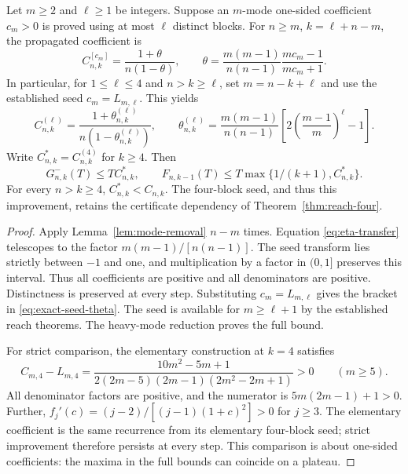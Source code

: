 \begin{theorem}
\label{thm:seeded}
Let $m\ge2$ and $\ell\ge1$ be integers. Suppose an $m$-mode one-sided coefficient $c_m>0$ is proved using at most
$\ell$ distinct blocks. For $n\ge m$, $k=\ell+n-m$, the propagated
coefficient is
\begin{equation}\label{eq:general-seed}
 C^{[c_m]}_{n,k}=\frac{1+\theta}{n(1-\theta)},\qquad
 \theta=\frac{m(m-1)}{n(n-1)}\frac{mc_m-1}{mc_m+1}.
\end{equation}
In particular, for $1\le\ell\le4$ and $n>k\ge\ell$, set $m=n-k+\ell$
and use the established seed $c_m=L_{m,\ell}$. This yields
\begin{equation}\label{eq:exact-seed-theta}
 C^{(\ell)}_{n,k}=\frac{1+\theta^{(\ell)}_{n,k}}
                         {n(1-\theta^{(\ell)}_{n,k})},\qquad
 \theta^{(\ell)}_{n,k}=\frac{m(m-1)}{n(n-1)}
             \left[2\left(\frac{m-1}{m}\right)^\ell-1\right].
\end{equation}
Write $C^*_{n,k}=C^{(4)}_{n,k}$ for $k\ge4$. Then
\begin{equation}\label{eq:seeded-full}
 G^-_{n,k}(T)\le TC^*_{n,k},\qquad
 F_{n,k-1}(T)\le T\max\{1/(k+1),C^*_{n,k}\}.
\end{equation}
For every $n>k\ge4$, $C^*_{n,k}<C_{n,k}$. The four-block seed, and thus
this improvement, retains the certificate dependency of
Theorem~\ref{thm:reach-four}.
\end{theorem}
\begin{proof}
Apply Lemma~\ref{lem:mode-removal} $n-m$ times. Equation
\eqref{eq:eta-transfer} telescopes to the factor $m(m-1)/[n(n-1)]$.
The seed transform lies strictly between $-1$ and one, and multiplication
by a factor in $(0,1]$ preserves this interval. Thus all coefficients are
positive and all denominators are positive. Distinctness is preserved at
every step. Substituting $c_m=L_{m,\ell}$ gives the bracket in
\eqref{eq:exact-seed-theta}. The seed is available for $m\ge\ell+1$
by the established reach theorems. The heavy-mode reduction proves the
full bound.

For strict comparison, the elementary construction at $k=4$ satisfies
\[
 C_{m,4}-L_{m,4}
 =\frac{10m^2-5m+1}
 {2(2m-5)(2m-1)(2m^2-2m+1)}>0\qquad(m\ge5).
\]
All denominator factors are positive, and the numerator is
$5m(2m-1)+1>0$. Further,
$f_j'(c)=(j-2)/[(j-1)(1+c)^2]>0$ for $j\ge3$.
The elementary coefficient is the same recurrence from its elementary
four-block seed; strict improvement therefore persists at every step.
This comparison is about one-sided coefficients: the maxima in the full
bounds can coincide on a plateau.
\end{proof}

